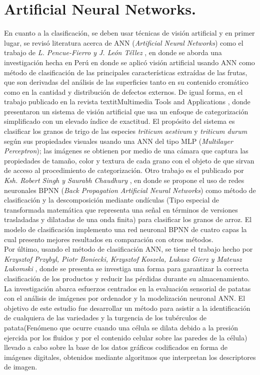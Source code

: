 \section{Artificial Neural Networks.}
	En cuanto a la clasificación, se deben usar técnicas de visión artificial y en primer lugar, se revisó literatura  acerca de ANN (\textit{Artificial Neural Networks}) como el trabajo de \textit{L. Pencue-Fierro y J. León Téllez} \cite{article2}, en donde se aborda una investigación hecha en Perú en donde se aplicó visión artificial usando ANN como método de clasificación de las principales características extraídas de las frutas, que son derivadas del análisis de las superficies tanto en su contenido cromático como en la cantidad y distribución de defectos externos. De igual forma, en el trabajo publicado en la revista textit{Multimedia Tools and Applications} \cite{Shrivastava2017}, donde presentaron un sistema de visión artificial que usa un enfoque de categorización simplificado con un elevado índice de exactitud. El propósito del sistema es clasificar los granos de trigo de las especies \textit{triticum aestivum} y \textit{triticum durum} según sus propiedades visuales usando una ANN del tipo MLP (\textit{Multilayer Perceptron}); las imágenes se obtienen por medio de una cámara que captura las propiedades de tamaño, color y textura de cada grano con el objeto de que sirvan de acceso al procedimiento de categorización. Otro trabajo es el publicado por \textit{Ksh. Robert Singh y Saurabh Chaudhury} \cite{Singh2016}, en donde se propone el uso de redes neuronales BPNN (\textit{Back Propagation Artificial Neural Networks}) como método de clasificación y la descomposición mediante ondículas (Tipo especial de transformada matemática que representa una señal en términos de versiones trasladadas y dilatadas de una onda finita) para clasificar los granos de arroz. El modelo de clasificación implemento una red neuronal BPNN de cuatro capas la cual presento mejores resultados en comparación con otros métodos.\\
	
	Por último, usando el método de clasificación ANN, se tiene el trabajo hecho por \textit{Krzysztof Przybyl, Piotr Boniecki, Krzysztof Koszela, Lukasz Gierz y Mateusz Lukomski} \cite{Przybyl2019}, donde se presenta se investiga una forma para garantizar la correcta clasificación de los productos y reducir las pérdidas durante su almacenamiento. La investigación abarca esfuerzos centrados en la evaluación sensorial de patatas con el análisis de imágenes por ordenador y la modelización neuronal ANN. El objetivo de este estudio fue desarrollar un método para asistir a la identificación de cualquiera de las variedades y la turgencia de los tubérculos de patata(Fenómeno que ocurre cuando una célula se dilata debido a la presión ejercida por los fluidos y por el contenido celular sobre las paredes de la célula) llevado a cabo sobre la base de los datos gráficos codificados en forma de imágenes digitales, obtenidos mediante algoritmos que interpretan los descriptores de imagen.\\

